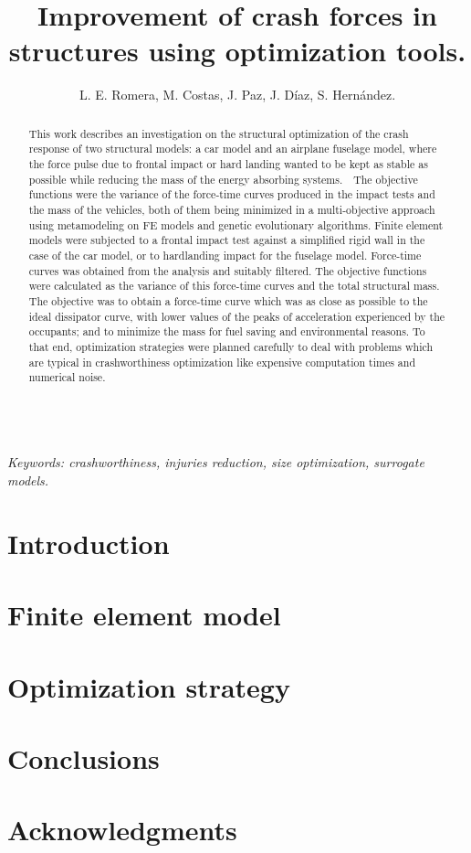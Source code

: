 \documentclass[cmfonts]{witpress}
\begin{document}
\title{Improvement of crash forces in structures using optimization tools.}

\author{L. E. Romera, M. Costas, J. Paz, J. D\'iaz, S. Hern\'andez.}

\address{Structural Mechanics Group, Universidade da Coru\~na, Spain.}

\maketitle

\begin{abstract}
This work describes an investigation on the structural optimization of the crash response of two structural models: a car model and an airplane fuselage model, where the force pulse due to frontal impact or hard landing wanted to be kept as stable as possible while reducing the mass of the energy absorbing systems.  The objective functions were the variance of the force-time curves produced in the impact tests and the mass of the vehicles, both of them being minimized in a multi-objective approach using metamodeling on FE models and genetic evolutionary algorithms. Finite element models were subjected to a frontal impact test against a simplified rigid wall in the case of the car model, or to hardlanding impact for the fuselage model. Force-time curves was obtained from the analysis and suitably filtered. The objective functions were calculated as the variance of this force-time curves and the total structural mass. The objective was to obtain a force-time curve which was as close as possible to the ideal dissipator curve, with lower values of the peaks of acceleration experienced by the occupants; and to minimize the mass for fuel saving and environmental reasons. To that end, optimization strategies were planned carefully to deal with problems which are typical in crashworthiness optimization like expensive computation times and numerical noise.
\end{abstract}\\
\emph{Keywords: crashworthiness, injuries reduction, size optimization, surrogate models.}

\section{Introduction}
\cite{funke84}
\section{Finite element model}
\cite{brebbia84}
\section{Optimization strategy}
\section{Conclusions}
\section{Acknowledgments}




\end{document}
